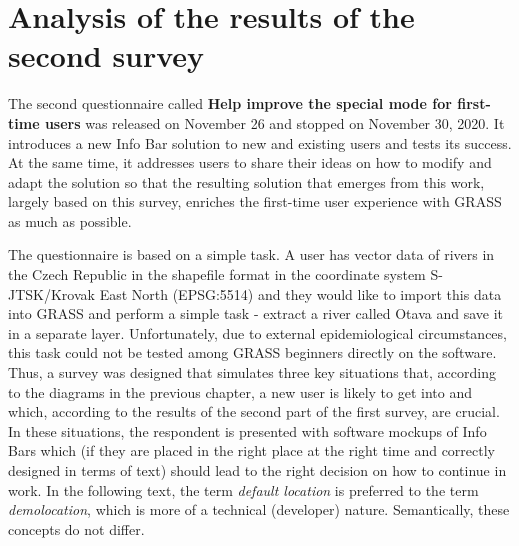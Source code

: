 \documentclass[a4paper,10pt,twoside]{article}
\begin{document}

\newpage
\vspace*{-1cm}
\section{Analysis of the results of the second survey}
\label{sec:qstat2}

\noindent The second questionnaire called \textbf{Help improve the special mode for first-time users} was released on November 26 and stopped on November 30, 2020. It introduces a new Info Bar solution to new and existing users and tests its success. At the same time, it addresses users to share their ideas on how to modify and adapt the solution so that the resulting solution that emerges from this work, largely based on this survey, enriches the first-time user experience with GRASS as much as possible.

The questionnaire is based on a simple task. A user has vector data of rivers in the Czech Republic in the shapefile format in the coordinate system S-JTSK/Krovak East North (EPSG:5514) and they would like to import this data into GRASS and perform a simple task - extract a river called Otava and save it in a separate layer. Unfortunately, due to external epidemiological circumstances, this task could not be tested among GRASS beginners directly on the software. Thus, a survey was designed that simulates three key situations that, according to the diagrams in the previous chapter, a new user is likely to get into and which, according to the results of the second part of the first survey, are crucial. In these situations, the respondent is presented with software mockups of Info Bars which (if they are placed in the right place at the right time and correctly designed in terms of text) should lead to the right decision on how to continue in work. In the following text, the term \textit{default location} is preferred to the term \textit{demolocation}, which is more of a technical (developer) nature. Semantically, these concepts do not differ.
\end{document}
